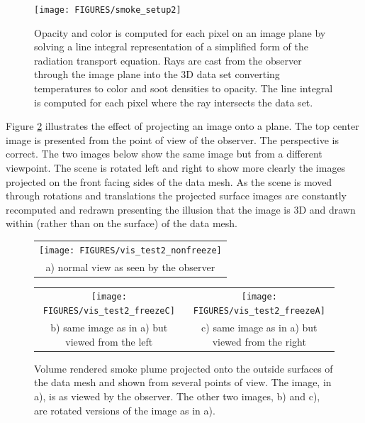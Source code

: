 {\begin{figure}[\figoptions]
\begin{center}
\texttt{[image: FIGURES/smoke\_setup2]}
\end{center}
\caption[Opacity and color is computed for each pixel on an image plane by solving a line integral
representation of a simplified form of the radiation transport equation.]{Opacity and color is computed for each pixel on an image plane by solving a line integral
representation of a simplified form of the radiation transport equation.  Rays are cast from the observer through the  image plane into the 3D data set converting temperatures to color and soot densities to opacity.  The line integral is computed for each pixel where the ray intersects the data set.
}
\label{figsmokesetup2}
\end{figure}

Figure \ref{fig:volplume_example} illustrates the effect of projecting an image onto a plane.  The top center image is presented from the point of view of the observer.  The perspective is correct.  The two images below show the same image but from a different viewpoint.  The scene is rotated left and right to show more clearly the images projected on the front facing sides of the data mesh.  As the scene is moved through rotations and translations the projected surface images are constantly recomputed and redrawn presenting the illusion that the image is 3D and drawn within (rather than on the surface) of the data mesh.


\begin{figure}[\figoptions]
\begin{center}
\begin{tabular}{c}
\texttt{[image: FIGURES/vis\_test2\_nonfreeze]}\\
a) normal view as seen by the observer
\end{tabular}
\begin{tabular}{cc}
\texttt{[image: FIGURES/vis\_test2\_freezeC]}&
\texttt{[image: FIGURES/vis\_test2\_freezeA]}\\
b) same image as in a) but viewed from the left&c) same image as in a) but viewed from the right\\
\end{tabular}
\end{center}
\caption[Volume rendered smoke plume shown from several points of view.]{Volume rendered smoke plume projected onto the outside surfaces of the data mesh and shown  from several points of view.
The image, in a), is as viewed by the observer.  The other two images, b) and c), are rotated versions of the image as in a).
}
\label{fig:volplume_example}
\end{figure}

}
